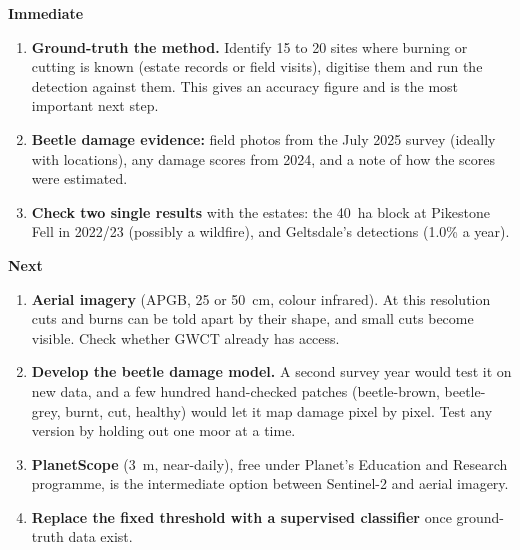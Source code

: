 \documentclass[11pt,a4paper]{article}
\begin{document}
\textbf{Immediate}
\begin{enumerate}
\item \textbf{Ground-truth the method.} Identify 15 to 20 sites where burning or cutting is known (estate records or field visits), digitise them and run the detection against them. This gives an accuracy figure and is the most important next step.
\item \textbf{Beetle damage evidence:} field photos from the July 2025 survey (ideally with locations), any damage scores from 2024, and a note of how the scores were estimated.
\item \textbf{Check two single results} with the estates: the 40~ha block at Pikestone Fell in 2022/23 (possibly a wildfire), and Geltsdale's detections (1.0\% a year).
\end{enumerate}

\textbf{Next}
\begin{enumerate}[resume]
\item \textbf{Aerial imagery} (APGB, 25 or 50~cm, colour infrared). At this resolution cuts and burns can be told apart by their shape, and small cuts become visible. Check whether GWCT already has access.
\item \textbf{Develop the beetle damage model.} A second survey year would test it on new data, and a few hundred hand-checked patches (beetle-brown, beetle-grey, burnt, cut, healthy) would let it map damage pixel by pixel. Test any version by holding out one moor at a time.
\item \textbf{PlanetScope} (3~m, near-daily), free under Planet's Education and Research programme, is the intermediate option between Sentinel-2 and aerial imagery.
\item \textbf{Replace the fixed threshold with a supervised classifier} once ground-truth data exist.
\end{enumerate}
\end{document}
